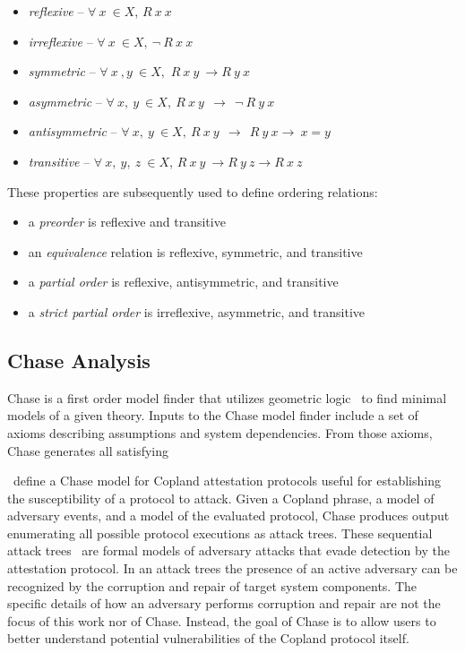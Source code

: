 \documentclass[runningheads]{llncs}
\theoremstyle{definition}
\newcommand{\squash}{\itemsep=0pt\parskip=0pt}
\begin{document}
\begin{itemize}
  \squash
\item \emph{reflexive} -- $ \forall\: x\: \in X$, $R\: x\: x$
\item \emph{irreflexive} -- $ \forall \: x\: \in X, \: \neg \: R\: x\: x$
\item \emph{symmetric} -- $ \forall\: x\: , y\: \in X,$ $R\: x\: y\:\rightarrow R\: y\: x$
\item \emph{asymmetric} --  $\forall\: x,\: y\:\in X,\: R\: x\: y\:\: \rightarrow  \:\: \neg \:R\: y\: x $  
\item \emph{antisymmetric} --  $\forall\: x,\: y\:\in X,\: R\: x\: y\:\: \rightarrow \:\: R\: y\: x \rightarrow \:x = y$ 
\item \emph{transitive} -- $ \forall\: x,\: y,\: z\:\in X$, $R\: x\: y\: \rightarrow R\: y\: z \rightarrow R\: x\: z$
\end{itemize}

\noindent These properties are subsequently used to define ordering relations:

\begin{itemize}
  \squash
\item a \emph{preorder} is reflexive and transitive
\item an \emph{equivalence} relation is reflexive, symmetric, and transitive 
\item a \emph{partial order} is reflexive, antisymmetric, and transitive 
\item a \emph{strict partial order} is irreflexive, asymmetric, and transitive 
\end{itemize}

\subsection*{Chase Analysis}

Chase \cite{Ramsdell:2020:Chase,Rowe:2021:AutomatedTrust} is a first
order model finder that utilizes geometric
logic~\citep{Enderton:logic} to find minimal models of a given
theory. Inputs to the Chase model finder include a set of axioms
describing assumptions and system dependencies. From those axioms,
Chase generates all satisfying


\citet{Rowe:2021:AutomatedTrust}~define a Chase model for Copland
attestation protocols useful for establishing the susceptibility of a
protocol to attack. Given a Copland phrase, a model of adversary
events, and a model of the evaluated protocol, Chase produces output
enumerating all possible protocol executions as attack trees. These
sequential attack trees~\citep{Horne:Attack, Jhaware:attack} are
formal models of adversary attacks that evade detection by the
attestation protocol.  In an attack trees the presence of an active
adversary can be recognized by the corruption and repair of target
system components. The specific details of how an adversary performs
corruption and repair are not the focus of this work nor of
Chase. Instead, the goal of Chase is to allow users to better
understand potential vulnerabilities of the Copland
protocol itself.
\end{document}
